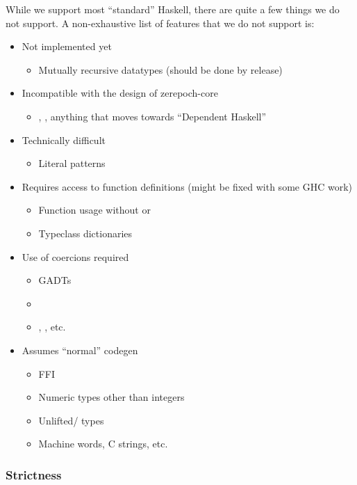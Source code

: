 While we support most ``standard'' Haskell, there are quite a few things we do not support. A non-exhaustive list of features that we do not support is:
\begin{itemize}
\item Not implemented yet
  \begin{itemize}
  \item Mutually recursive datatypes (should be done by release)
  \end{itemize}
\item Incompatible with the design of \gls{zerepoch-core}
  \begin{itemize}
    \item {}, , anything that moves towards ``Dependent Haskell''
  \end{itemize}
\item Technically difficult
  \begin{itemize}
  \item Literal patterns
  \end{itemize}
\item Requires access to function definitions (might be fixed with some GHC work)
  \begin{itemize}
  \item Function usage without  or 
  \item Typeclass dictionaries
  \end{itemize}
\item Use of coercions required
  \begin{itemize}
  \item GADTs
  \item {}
  \item {}, , etc.
  \end{itemize}
\item Assumes ``normal'' codegen
  \begin{itemize}
  \item FFI
  \item Numeric types other than integers
  \item Unlifted/ types
  \item Machine words, C strings, etc.
  \end{itemize}
\end{itemize}

\subsubsection{Strictness}
\label{sec:zerepoch-tx-strictness}

